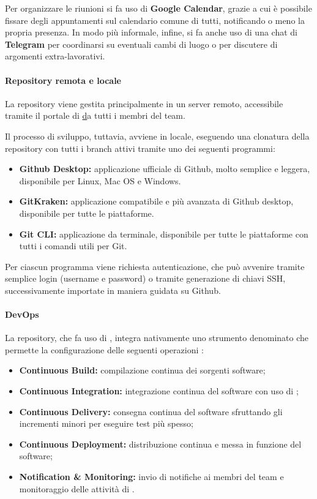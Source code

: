 	Per organizzare le riunioni si fa uso di \textbf{Google Calendar}, grazie a cui è possibile fissare degli appuntamenti sul calendario comune di tutti, notificando o meno la propria presenza.
	In modo più informale, infine, si fa anche uso di una chat di \textbf{Telegram} per coordinarsi su eventuali cambi di luogo o per discutere di argomenti extra-lavorativi.

	\paragraph{Repository remota e locale}

	La repository viene gestita principalmente in un server remoto, accessibile tramite il portale di \href{Github.com} da tutti i membri del team.

	Il processo di sviluppo, tuttavia, avviene in locale, eseguendo una clonatura della repository con tutti i branch attivi tramite uno dei seguenti programmi:

	\begin{itemize}
		\item \textbf{Github Desktop:} applicazione ufficiale di Github, molto semplice e leggera, disponibile per Linux, Mac OS e Windows.
		\item \textbf{GitKraken:} applicazione compatibile e più avanzata di Github desktop, disponibile per tutte le piattaforme.
		\item \textbf{Git CLI:} applicazione da terminale, disponibile per tutte le piattaforme con tutti i comandi utili per Git.
	\end{itemize}

	Per ciascun programma viene richiesta autenticazione, che può avvenire tramite semplice login (username e password) o tramite generazione di chiavi SSH, successivamente importate in maniera guidata su Github.

	\paragraph{DevOps}

	La repository, che fa uso di , integra nativamente uno strumento denominato  che permette la configurazione delle seguenti operazioni :
	\begin{itemize}
		\item \textbf{Continuous Build:} compilazione continua dei sorgenti software;
		\item \textbf{Continuous Integration:} integrazione continua del software con uso di ;
		\item \textbf{Continuous Delivery:} consegna continua del software sfruttando gli incrementi minori per eseguire test più spesso;
		\item \textbf{Continuous Deployment:} distribuzione continua e messa in funzione del software;
		\item \textbf{Notification \& Monitoring:} invio di notifiche ai membri del team e monitoraggio delle attività di .
	\end{itemize}

